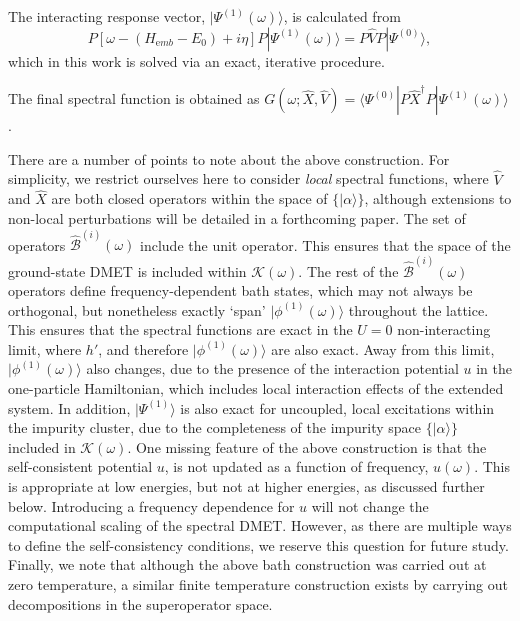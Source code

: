 \documentclass[aps,twocolumn,nobibnotes]{revtex4}
\begin{document}
\begin{inparaenum}
\item The interacting response vector, $|\Psi^{(1)} (\omega) \rangle$, is calculated from
\begin{equation}
    P \left[ \omega - (H_{\mathrm emb}-E_0) + i \eta \right] P | \Psi^{(1)}(\omega) \rangle = P {\hat V} P |\Psi^{(0)} \rangle   ,   \label{eqn:ExactResponse}
\end{equation}
which in this work is solved via an exact, iterative procedure\cite{Langou2005}.
\item The final spectral function is obtained as $G(\omega; \hat{X}, \hat{V}) = \langle \Psi^{(0)} | P \hat{X}^{\dagger} P | \Psi^{(1)}(\omega) \rangle$.
\end{inparaenum}

There are a number of points to note about the above construction. For simplicity, we restrict ourselves here to consider {\em local} spectral functions, where
${\hat V}$ and ${\hat X}$ are both closed operators within the space of $\{|\alpha \rangle \}$, although extensions to non-local perturbations will be detailed in a forthcoming paper.
The set of operators ${\hat {\mathcal{B}}}^{(i)}(\omega)$ include the unit operator.
This ensures that
the space of the ground-state DMET is included within $\mathcal{K}(\omega)$. The rest of the ${\hat {\mathcal{B}}}^{(i)}(\omega)$ operators define frequency-dependent
bath states, which may not always be orthogonal, but nonetheless exactly `span' $|\phi^{(1)}(\omega) \rangle$ throughout the lattice. This ensures that the spectral functions are exact in 
the $U=0$ non-interacting limit, where $h'$, and therefore $|\phi^{(1)}(\omega) \rangle$ are also exact. Away from this limit, 
$|\phi^{(1)}(\omega) \rangle$ also changes, due to the presence of the interaction potential $u$ in the one-particle Hamiltonian, which 
includes local interaction effects of the extended system.
In addition, $|\Psi^{(1)} \rangle $ is also exact for uncoupled, local excitations within the impurity cluster, due
to the completeness of the impurity space $\{ |\alpha \rangle \}$ included in $\mathcal{K}(\omega)$.
One missing feature of the above construction is that the self-consistent potential $u$, is not updated as a function
of frequency, $u(\omega)$. This is appropriate at low energies, but not at higher 
energies, as discussed further below. Introducing a frequency dependence for $u$ will not change the computational 
scaling of the spectral DMET.  However, as there are multiple ways to define the self-consistency conditions, 
we reserve this question for future study.
Finally, we note that although the above bath construction was carried out at zero temperature, a similar finite temperature construction exists by carrying 
out decompositions in the superoperator space.
\end{document}
